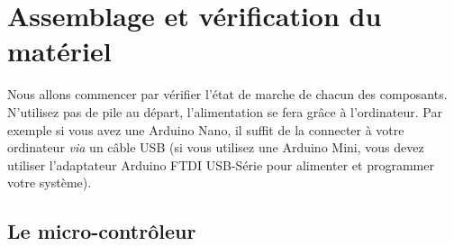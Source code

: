 \documentclass[twocolumn,landscape, 8pt]{article}
\begin{document}
\section{Assemblage et vérification du matériel}

\par Nous allons commencer par vérifier l'état de marche de chacun des composants. N'utilisez pas de pile au départ, l'alimentation se fera grâce à l'ordinateur. Par exemple si vous avez une Arduino Nano, il suffit de la connecter à votre ordinateur \textit{via} un câble USB (si vous utilisez une Arduino Mini, vous devez utiliser l'adaptateur Arduino FTDI USB-Série pour alimenter et programmer votre système).

\subsection{Le micro-contrôleur}
\end{document}
